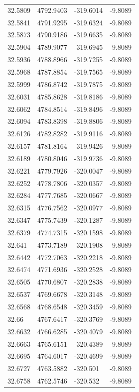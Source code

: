 \begin{table}[H]
\begin{tabular}{llll}
32.5809 & 4792.9403 & -319.6014 & -9.8089 \\
32.5841 & 4791.9295 & -319.6324 & -9.8089 \\
32.5873 & 4790.9186 & -319.6635 & -9.8089 \\
32.5904 & 4789.9077 & -319.6945 & -9.8089 \\
32.5936 & 4788.8966 & -319.7255 & -9.8089 \\
32.5968 & 4787.8854 & -319.7565 & -9.8089 \\
32.5999 & 4786.8742 & -319.7875 & -9.8089 \\
32.6031 & 4785.8628 & -319.8186 & -9.8089 \\
32.6062 & 4784.8514 & -319.8496 & -9.8089 \\
32.6094 & 4783.8398 & -319.8806 & -9.8089 \\
32.6126 & 4782.8282 & -319.9116 & -9.8089 \\
32.6157 & 4781.8164 & -319.9426 & -9.8089 \\
32.6189 & 4780.8046 & -319.9736 & -9.8089 \\
32.6221 & 4779.7926 & -320.0047 & -9.8089 \\
32.6252 & 4778.7806 & -320.0357 & -9.8089 \\
32.6284 & 4777.7685 & -320.0667 & -9.8089 \\
32.6315 & 4776.7562 & -320.0977 & -9.8089 \\
32.6347 & 4775.7439 & -320.1287 & -9.8089 \\
32.6379 & 4774.7315 & -320.1598 & -9.8089 \\
32.641 & 4773.7189 & -320.1908 & -9.8089 \\
32.6442 & 4772.7063 & -320.2218 & -9.8089 \\
32.6474 & 4771.6936 & -320.2528 & -9.8089 \\
32.6505 & 4770.6807 & -320.2838 & -9.8089 \\
32.6537 & 4769.6678 & -320.3148 & -9.8089 \\
32.6568 & 4768.6548 & -320.3459 & -9.8089 \\
32.66 & 4767.6417 & -320.3769 & -9.8089 \\
32.6632 & 4766.6285 & -320.4079 & -9.8089 \\
32.6663 & 4765.6151 & -320.4389 & -9.8089 \\
32.6695 & 4764.6017 & -320.4699 & -9.8089 \\
32.6727 & 4763.5882 & -320.501 & -9.8089 \\
32.6758 & 4762.5746 & -320.532 & -9.8089 \\

\end{tabular}
\end{table}
